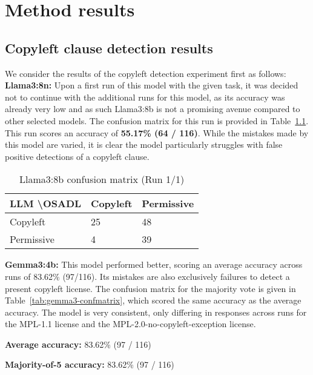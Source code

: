 
\chapter{Method results}\label{ch:results}

\section{Copyleft clause detection results}

We consider the results of the copyleft detection experiment first as follows: \\

\textbf{Llama3:8n:} Upon a first run of this model with the given task, it was decided not to continue with the additional runs for this model, as its accuracy was already very low and as such Llama3:8b is not a promising avenue compared to other selected models. The confusion matrix for this run is provided in Table~\ref{tab:llama3-1-confmatrix}. This run scores an accuracy of \textbf{55.17\% (64 / 116)}. While the mistakes made by this model are varied, it is clear the model particularly struggles with false positive detections of a copyleft clause.

\begin{table}[h]
	\caption{Llama3:8b confusion matrix (Run 1/1)}
	\label{tab:llama3-1-confmatrix}
	\centering
	\begin{tabular}{l|ll}
		\hline
		\textbf{LLM \textbackslash OSADL} & Copyleft & Permissive \\ \hline
		Copyleft & 25 & 48 \\
		Permissive & 4 & 39 \\\hline
	\end{tabular}
\end{table}

\textbf{Gemma3:4b:} This model performed better, scoring an average accuracy across runs of 83.62\% (97/116). Its mistakes are also exclusively failures to detect a present copyleft license. The confusion matrix for the majority vote is given in Table~\ref{tab:gemma3-confmatrix}, which scored the same accuracy as the average accuracy. The model is very consistent, only differing in responses across runs for the MPL-1.1 license and the MPL-2.0-no-copyleft-exception license.

\textbf{Average accuracy:} 83.62\% (97 / 116)

\textbf{Majority-of-5 accuracy:} 83.62\% (97 / 116)

